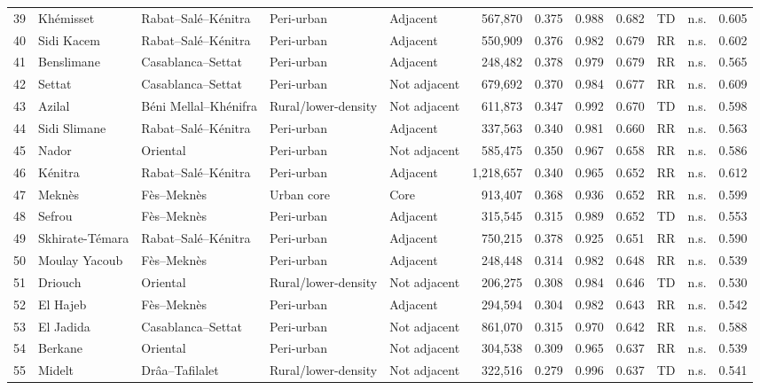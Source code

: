 \documentclass[10pt]{article}
\begin{document}
\begin{longtable}{@{}r>{\raggedright\arraybackslash}p{2.9cm}>{\raggedright\arraybackslash}p{3.3cm}llrrrrllr@{}}
39 & Khémisset & Rabat--Salé--Kénitra & Peri-urban & Adjacent & 567,870 & 0.375 & 0.988 & 0.682 & TD & n.s. & 0.605 \\
40 & Sidi Kacem & Rabat--Salé--Kénitra & Peri-urban & Adjacent & 550,909 & 0.376 & 0.982 & 0.679 & RR & n.s. & 0.602 \\
41 & Benslimane & Casablanca--Settat & Peri-urban & Adjacent & 248,482 & 0.378 & 0.979 & 0.679 & RR & n.s. & 0.565 \\
42 & Settat & Casablanca--Settat & Peri-urban & Not adjacent & 679,692 & 0.370 & 0.984 & 0.677 & RR & n.s. & 0.609 \\
43 & Azilal & Béni Mellal--Khénifra & Rural/lower-density & Not adjacent & 611,873 & 0.347 & 0.992 & 0.670 & TD & n.s. & 0.598 \\
44 & Sidi Slimane & Rabat--Salé--Kénitra & Peri-urban & Adjacent & 337,563 & 0.340 & 0.981 & 0.660 & RR & n.s. & 0.563 \\
45 & Nador & Oriental & Peri-urban & Not adjacent & 585,475 & 0.350 & 0.967 & 0.658 & RR & n.s. & 0.586 \\
46 & Kénitra & Rabat--Salé--Kénitra & Peri-urban & Adjacent & 1,218,657 & 0.340 & 0.965 & 0.652 & RR & n.s. & 0.612 \\
47 & Meknès & Fès--Meknès & Urban core & Core & 913,407 & 0.368 & 0.936 & 0.652 & RR & n.s. & 0.599 \\
48 & Sefrou & Fès--Meknès & Peri-urban & Adjacent & 315,545 & 0.315 & 0.989 & 0.652 & TD & n.s. & 0.553 \\
49 & Skhirate-Témara & Rabat--Salé--Kénitra & Peri-urban & Adjacent & 750,215 & 0.378 & 0.925 & 0.651 & RR & n.s. & 0.590 \\
50 & Moulay Yacoub & Fès--Meknès & Peri-urban & Adjacent & 248,448 & 0.314 & 0.982 & 0.648 & RR & n.s. & 0.539 \\
51 & Driouch & Oriental & Rural/lower-density & Not adjacent & 206,275 & 0.308 & 0.984 & 0.646 & TD & n.s. & 0.530 \\
52 & El Hajeb & Fès--Meknès & Peri-urban & Adjacent & 294,594 & 0.304 & 0.982 & 0.643 & RR & n.s. & 0.542 \\
53 & El Jadida & Casablanca--Settat & Peri-urban & Not adjacent & 861,070 & 0.315 & 0.970 & 0.642 & RR & n.s. & 0.588 \\
54 & Berkane & Oriental & Peri-urban & Not adjacent & 304,538 & 0.309 & 0.965 & 0.637 & RR & n.s. & 0.539 \\
55 & Midelt & Drâa--Tafilalet & Rural/lower-density & Not adjacent & 322,516 & 0.279 & 0.996 & 0.637 & TD & n.s. & 0.541 \\

\end{longtable}
\end{document}
